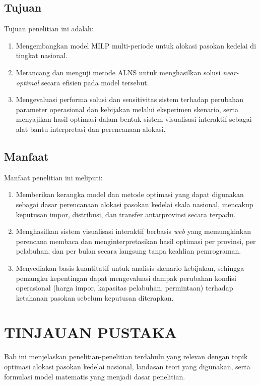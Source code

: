 \documentclass{file/TA-ITS}
\theoremstyle{definition}
\theoremstyle{definition}
\theoremstyle{plain}
\begin{document}
\section{Tujuan}
Tujuan penelitian ini adalah:
\begin{enumerate}
    \item Mengembangkan model MILP multi-periode untuk alokasi pasokan kedelai di tingkat nasional.
    \item Merancang dan menguji metode ALNS untuk menghasilkan solusi \textit{near-optimal} secara efisien pada model tersebut.
    \item Mengevaluasi performa solusi dan sensitivitas sistem terhadap perubahan parameter operasional dan kebijakan melalui eksperimen skenario, serta menyajikan hasil optimasi dalam bentuk sistem visualisasi interaktif sebagai alat bantu interpretasi dan perencanaan alokasi.
\end{enumerate}

\section{Manfaat}
Manfaat penelitian ini meliputi:
\begin{enumerate}
    \item Memberikan kerangka model dan metode optimasi yang dapat digunakan sebagai dasar perencanaan alokasi pasokan kedelai skala nasional, mencakup keputusan impor, distribusi, dan transfer antarprovinsi secara terpadu.
    \item Menghasilkan sistem visualisasi interaktif berbasis \textit{web} yang memungkinkan perencana membaca dan menginterpretasikan hasil optimasi per provinsi, per pelabuhan, dan per bulan secara langsung tanpa keahlian pemrograman.
    \item Menyediakan basis kuantitatif untuk analisis skenario kebijakan, sehingga pemangku kepentingan dapat mengevaluasi dampak perubahan kondisi operasional (harga impor, kapasitas pelabuhan, permintaan) terhadap ketahanan pasokan sebelum keputusan diterapkan.
\end{enumerate}




\pagebreak
\chapter{TINJAUAN PUSTAKA}
Bab ini menjelaskan penelitian-penelitian terdahulu yang relevan dengan topik optimasi alokasi pasokan kedelai nasional, landasan teori yang digunakan, serta formulasi model matematis yang menjadi dasar penelitian.
\end{document}
